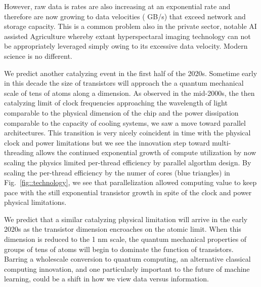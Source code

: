 \documentclass{article}
\begin{document}
However, raw data is rates are also increasing at an exponential rate and therefore are now growing to data velocities ( GB/s) that exceed network and storage capacity.  This is a common problem also in the private sector, notable AI assisted Agriculture whereby extant hyperspectaral imaging technology can not be appropriately leveraged simply owing to its excessive data velocity.
Modern science is no different.


We predict another catalyzing event in the first half of the 2020s.
Sometime early in this decade the size of transistors will approach the a quantum mechanical scale of tens of atoms along a dimension.
As observed in the mid-2000s, the then catalyzing limit of clock frequencies approaching the wavelength of light comparable to the physical dimension of the chip and the power dissipation comparable to the capacity of cooling systems, we saw a move toward parallel architectures. 
This transition is very nicely coincident in time with the physical clock and power limitations but we see the innovation step toward multi-threading allows the continued exponential growth of compute utilization by now scaling the physics limited per-thread efficiency by parallel algorthm design.
By scaling the per-thread efficiency by the numer of cores (blue triangles) in Fig.~\ref{fig::technology}, we see that parallelization allowed computing value to keep pace with the still exponential transistor growth in spite of the clock and power physical limitations.

We predict that a similar catalyzing physical limitation will arrive in the early 2020s as the transistor dimension encroaches on the atomic limit.
When this dimension is reduced to the 1 nm scale, the quantum mechanical properties of groups of tens of atoms will begin to dominate the function of transistors.
Barring a wholescale conversion to quantum computing, an alternative classical computing innovation, and one particularly important to the future of machine learning, could be a shift in how we view data versus information.
\end{document}
